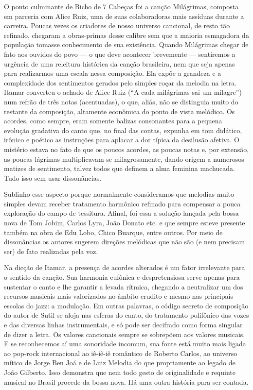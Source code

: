 O ponto culminante de Bicho de 7 Cabeças foi a canção Milágrimas, composta em parceria com Alice Ruiz, uma de suas colaboradoras mais
assíduas durante a carreira. Poucas vezes os criadores de nosso universo
cancional, de resto tão refinado, chegaram a obras-primas desse calibre
sem que a maioria esmagadora da população tomasse conhecimento de sua
existência. Quando Milágrimas chegar de fato aos ouvidos do povo --- o que
deve acontecer brevemente --- sentiremos a urgência de uma releitura
histórica da canção brasileira, nem que seja apenas para realizarmos uma
escala nessa composição. Ela expõe a grandeza e a complexidade dos
sentimentos gerados pelo simples roçar da melodia na letra. Itamar
converteu o achado de Alice Ruiz (``A cada milágrimas sai um milagre'')
num refrão de três notas (acentuadas), o que, aliás, não se distinguia
muito do restante da composição, altamente econômica do ponto de vista
melódico. Os acordes, como sempre, eram somente balizas consonantes para
a pequena evolução gradativa do canto que, no final das contas, expunha
em tom didático, irônico e poético as instruções para aplacar a dor
típica da desilusão afetiva. O mistério estava no fato de que os poucos
acordes, as poucas notas e, por extensão, as poucas lágrimas
multiplicavam-se milagrosamente, dando origem a numerosos matizes de
sentimento, talvez todos que definem a alma feminina machucada. Tudo
isso sem usar dissonâncias.

Sublinho esse aspecto porque normalmente consideramos que melodias muito
simples devam receber tratamento harmônico refinado para compensar a
pouca exploração do campo de tessitura. Afinal, foi essa a solução
lançada pela bossa nova de Tom Jobim, Carlos Lyra, João Donato etc. e
que sempre esteve presente também na obra de Edu Lobo, Chico Buarque,
entre outros. Por meio de dissonâncias os autores sugerem direções
melódicas que não são (e nem precisam ser) de fato realizadas pela voz.

Na dicção de Itamar, a presença de acordes alterados é um fator
irrelevante para o sentido da canção. Sua harmonia eufônica e
despretensiosa serve apenas para sustentar o canto e lhe garantir a
levada rítmica, chegando a neutralizar um dos recursos musicais mais
valorizados no âmbito erudito e mesmo nas principais escolas do jazz: a
modulação. Em outras palavras, o código secreto de composição do autor
de Sutil se aloja nas esferas do canto, do tratamento polifônico das
vozes e das diversas linhas instrumentais, e só pode ser decifrado como
forma singular de dizer a letra. Os valores cancionais sempre se
sobrepõem aos valores musicais. E se reconhecemos aí uma sonoridade
incomum, sua fonte está muito mais ligada ao pop-rock internacional ao
iê-iê-iê romântico de Roberto Carlos, ao universo mítico de Jorge Ben
Joá e de Luiz Melodia do que propriamente ao legado de João Gilberto.
Isso demonstra que nem todo gesto de originalidade e requinte musical
no Brasil procede da bossa nova. Há uma outra história para ser contada.


